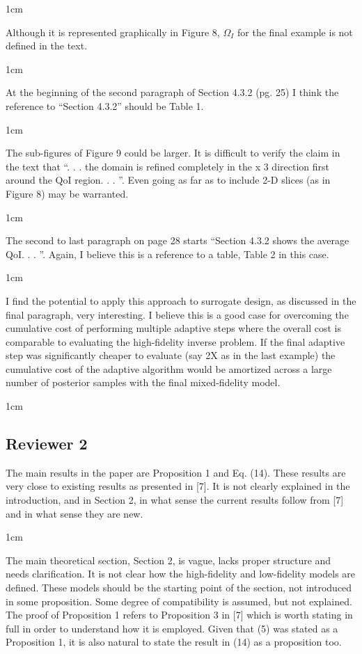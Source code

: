 \documentclass[12pt, letterpaper]{article}
\newcommand{\answer}[1]{\begin{adjustwidth}{1cm}{}{\color{blue}#1}\end{adjustwidth}}
\newcommand{\notdone}{{\color{red}{Changes not yet made.}}}
\begin{document}
\answer{}
\notdone

Although it is represented graphically in Figure 8, $\Omega_I$ for the final example is not defined in the text.

\answer{}
\notdone

At the beginning of the second paragraph of Section 4.3.2 (pg. 25) I think the reference to “Section
4.3.2” should be Table 1.

\answer{}
\notdone

The sub-figures of Figure 9 could be larger. It is difficult to verify the claim in the text that “. . . the
domain is refined completely in the x 3 direction first around the QoI region. . . ”. Even going as far as
to include 2-D slices (as in Figure 8) may be warranted.

\answer{}
\notdone

The second to last paragraph on page 28 starts “Section 4.3.2 shows the average QoI. . . ”. Again, I
believe this is a reference to a table, Table 2 in this case.

\answer{}
\notdone

I find the potential to apply this approach to surrogate design, as discussed in the final paragraph, very
interesting. I believe this is a good case for overcoming the cumulative cost of performing multiple
adaptive steps where the overall cost is comparable to evaluating the high-fidelity inverse problem.
If the final adaptive step was significantly cheaper to evaluate (say 2X as in the last example) the
cumulative cost of the adaptive algorithm would be amortized across a large number of posterior
samples with the final mixed-fidelity model.

\answer{}


\subsection*{Reviewer 2}

The main results in the paper are Proposition 1 and Eq. (14). These results are very close to existing results as presented in [7]. It is not clearly explained in the introduction, and in Section 2, in what sense the current results follow from [7] and in what sense they are new. 

\answer{}
\notdone

The main theoretical section, Section 2, is vague, lacks proper structure and needs clarification. It is not clear how the high-fidelity and low-fidelity models are defined. These models should be the starting point of the section, not introduced in some proposition. Some degree of compatibility is assumed, but not explained. The proof of Proposition 1 refers to Proposition 3 in [7] which is worth stating in full in order to understand how it is employed. Given that (5) was stated as a Proposition 1, it is also natural to state the result in (14) as a proposition too. 
\end{document}
